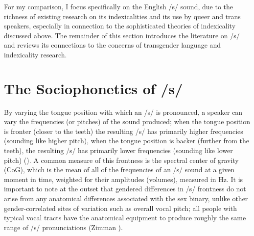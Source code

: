 \documentclass[12pt,twoside]{reedthesis}
\begin{document}
For my comparison, I focus specifically on the English /s/ sound, due to the richness of existing research on its indexicalities and its use by queer and trans speakers, especially in connection to the sophisticated theories of indexicality discussed above. The remainder of this section introduces the literature on /s/ and reviews its connections to the concerns of transgender language and indexicality research.
	
\section{The Sociophonetics of /s/}
By varying the tongue position with which an /s/ is pronounced, a speaker can vary the frequencies (or pitches) of the sound produced; when the tongue position is fronter (closer to the teeth) the resulting /s/ has primarily higher frequencies (sounding like higher pitch), when the tongue position is backer (further from the teeth), the resulting /s/ has primarily lower frequencies (sounding like lower pitch) (\cite{fuchs_differences_2010}). A common measure of this frontness is the spectral center of gravity (CoG), which is the mean of all of the frequencies of an /s/ sound at a given moment in time, weighted for their amplitudes (volumes), measured in Hz. It is important to note at the outset that gendered differences in /s/ frontness do not arise from any anatomical differences associated with the sex binary, unlike other gender-correlated sites of variation such as overall vocal pitch; all people with typical vocal tracts have the anatomical equipment to produce roughly the same range of /s/ pronunciations (Zimman \cite*{zimman_variability_2017, zimman_gender_2021}).
\end{document}
